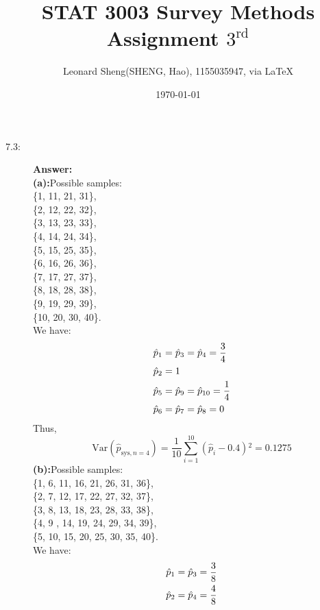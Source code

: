 \documentclass{article}
\begin{document}
\title{STAT 3003 Survey Methods \\Assignment $3^{\text{rd}}$}
\author{{\normalsize Leonard Sheng(SHENG, Hao), 1155035947, via \LaTeX}}
\date{\today}

\maketitle

\def \Pr{{\rm Pr}}

\baselineskip 0.6cm
\begin{description}
    \item[7.3:]{\bf Answer:}\\
    {\bf (a):}Possible samples:\\
     \{1, 11, 21, 31\}, \\ \{2, 12, 22, 32\},\\ \{3, 13, 23, 33\},\\ \{4, 14, 24, 34\},\\ \{5, 15, 25, 35\},\\ \{6, 16, 26, 36\},\\ \{7, 17, 27, 37\},\\ \{8, 18, 28, 38\},\\ \{9, 19, 29, 39\},\\ \{10, 20, 30, 40\}.\\
    We have:
    \begin{align} \notag
      \hat{p}_1&=\hat{p}_3=\hat{p}_4=\frac{3}{4}\\ \notag
      \hat{p}_2&=1\\ \notag
      \hat{p}_5&=\hat{p}_9=\hat{p}_{10}=\frac{1}{4}\\ \notag
      \hat{p}_6&=\hat{p}_7=\hat{p}_8=0
    \end{align}
    Thus,$$\text{Var}\left(\hat{p}_{\text{sys},n=4}\right)=\frac{1}{10}\sum _{i=1}^{10} \left(\hat{p}_i-0.4\right){}^2=0.1275$$
    {\bf (b):}Possible samples:\\
    \{1, 6, 11, 16, 21, 26, 31, 36\},\\
    \{2, 7, 12, 17, 22, 27, 32, 37\},\\
    \{3, 8, 13, 18, 23, 28, 33, 38\},\\
    \{4, 9 , 14, 19, 24, 29, 34, 39\},\\
    \{5, 10, 15, 20, 25, 30, 35, 40\}.\\
    We have:
    \begin{align} \notag
      \hat{p}_1=\hat{p}_3=\frac{3}{8}\\ \notag
      \hat{p}_2=\hat{p}_4=\frac{4}{8}\\ \notag

\end{align}
\end{description}
\end{document}
